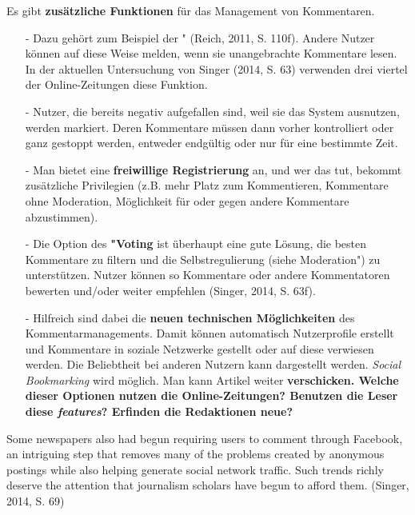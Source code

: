 Es gibt {\bf zusätzliche  Funktionen} für das Management von Kommentaren. 
\begin{itemize}
\item[-] Dazu gehört zum Beispiel der  " (Reich, 2011, S. 110f). Andere Nutzer können auf diese Weise melden, wenn sie unangebrachte Kommentare lesen. In der aktuellen Untersuchung von Singer (2014, S. 63) verwenden drei viertel der Online-Zeitungen diese Funktion.  
\item[-] Nutzer, die bereits negativ aufgefallen sind, weil sie das System ausnutzen, werden markiert. Deren Kommentare müssen dann vorher kontrolliert oder ganz gestoppt werden, entweder endgültig oder nur für eine bestimmte Zeit. 
\item[-] Man bietet eine  {\bf freiwillige Registrierung} an, und wer das tut, bekommt zusätzliche Privilegien (z.B. mehr Platz zum Kommentieren, Kommentare ohne Moderation, Möglichkeit für oder gegen andere Kommentare abzustimmen). 
\item[-] Die Option des  {\bf "Voting\grqq} ist überhaupt eine gute Lösung, die besten Kommentare zu filtern und die Selbstregulierung (siehe \glqq Moderation") zu unterstützen. Nutzer können so Kommentare oder andere Kommentatoren bewerten und/oder weiter empfehlen (Singer, 2014, S. 63f).
 \item[-] Hilfreich sind dabei die {\bf neuen technischen Möglichkeiten} des Kommentarmanagements. Damit können automatisch Nutzerprofile erstellt und Kommentare in soziale Netzwerke gestellt oder auf diese verwiesen werden. Die Beliebtheit bei anderen Nutzern kann dargestellt werden. {\slshape Social Bookmarking} wird möglich. Man kann Artikel weiter \bf verschicken. Welche dieser Optionen nutzen die Online-Zeitungen? Benutzen die Leser diese {\slshape features}? Erfinden die Redaktionen neue?

\end{itemize}


Some newspapers also had begun requiring users to
comment through Facebook, an intriguing step that removes many of the problems created
by anonymous postings while also helping generate social network traffic. Such
trends richly deserve the attention that journalism scholars have begun to afford them.
(Singer, 2014, S. 69)




